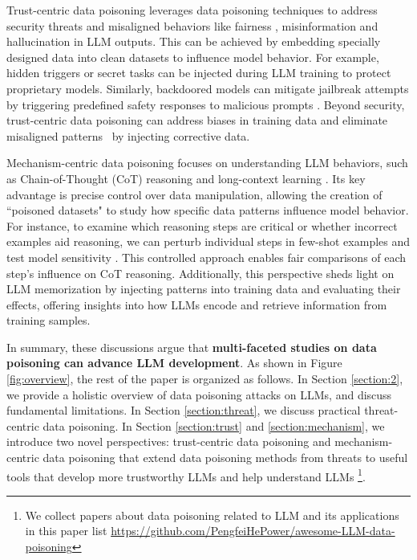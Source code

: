 Trust-centric data poisoning leverages data poisoning techniques to address security threats and misaligned behaviors like fairness \citep{li2023survey}, misinformation \citep{chen2023can} and hallucination \citep{yao2023llm} in LLM outputs. This can be achieved by embedding specially designed data into clean datasets to influence model behavior. For example, hidden triggers \citep{kirchenbauer2023watermark, zhao2023provable} or secret tasks \citep{chinadaily2024stanford} can be injected during LLM training to protect proprietary models. Similarly, backdoored models can mitigate jailbreak attempts by triggering predefined safety responses to malicious prompts \citep{chen2024bathe, bowen2024data}. Beyond security, trust-centric data poisoning can address biases in training data and eliminate misaligned patterns~\citep{zhang2024poisoning} by injecting corrective data. 

Mechanism-centric data poisoning focuses on understanding LLM behaviors, such as Chain-of-Thought (CoT) reasoning \citep{wei2022chain} and long-context learning \citep{li2024long}. Its key advantage is precise control over data manipulation, allowing the creation of ``poisoned datasets" to study how specific data patterns influence model behavior. For instance, to examine which reasoning steps are critical or whether incorrect examples aid reasoning, we can perturb individual steps in few-shot examples and test model sensitivity \citep{cui2024theoretical, he2024towards}. This controlled approach enables fair comparisons of each step's influence on CoT reasoning. Additionally, this perspective sheds light on LLM memorization by injecting patterns into training data and evaluating their effects, offering insights into how LLMs encode and retrieve information from training samples.

In summary, these discussions argue that \textbf{multi-faceted studies on data poisoning can advance LLM development}. As shown in Figure \ref{fig:overview}, the rest of the paper is organized as follows. In Section \ref{section:2}, we provide a holistic overview of data poisoning attacks on LLMs, and discuss fundamental limitations. In Section \ref{section:threat}, we discuss practical threat-centric data poisoning. In Section \ref{section:trust} and \ref{section:mechanism}, we introduce two novel perspectives: trust-centric data poisoning and mechanism-centric data poisoning that extend data poisoning methods from threats to useful tools that develop more trustworthy LLMs and help understand LLMs \footnote{We collect papers about data poisoning related to LLM and its applications in this paper list \url{https://github.com/PengfeiHePower/awesome-LLM-data-poisoning}}.
